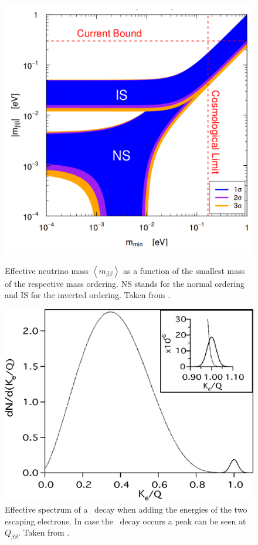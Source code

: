 \documentclass[encoding=utf8,british]{tumphthesis}
\begin{document}
\begin{figure}[t!]
	\centering
	\begin{minipage}[t]{.475\textwidth}
		\centering
		\includegraphics[width=.825\textwidth]{./Bilder/NeutrinoMassOrdering.png}
		\caption{Effective neutrino mass $\left\langle m_{\beta\beta}\right\rangle$ as a function of the smallest mass of the respective mass ordering. NS stands for the normal ordering and IS for the inverted ordering. Taken from \cite{bilenky_neutrinoless_2012}.}
		\label{fig:MassOrder}
	\end{minipage}\hfill%
	\begin{minipage}[t]{.475\textwidth}
		\centering
		\includegraphics[width=\textwidth]{./Bilder/TheoretischesSpektrmdes0nubbDecay.png}
		\caption{Effective spectrum of a \twonu\ decay when adding the energies of the two escaping electrons. In case the \onbb\ decay occurs a peak can be seen at $Q_{\beta\beta} $. Taken from \cite{elliott_double_2002}.}
		\label{fig:TheoSpektrum}
	\end{minipage}
\end{figure}
\end{document}
